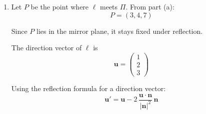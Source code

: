 \documentclass[leqno]{article}
\begin{document}
\begin{enumerate}[
  label=\textbf{\arabic*.},
  leftmargin=*,
  topsep=0pt,
  partopsep=0pt,
  parsep=0pt
]
\begin{djsSolution}
\begin{enumerate}[label=\textbf{(\alph*)}]
  So the image point is \(A'=(8,0,5)\).

  {\setlength{\parskip}{8pt}%
  \textit{Alternative Solution:}

  Find \(A'\) using the point \(B\) from part (b).

  From part (b), the perpendicular from \(A\) meets \(\Pi\) at \(B(4,2,3)\), so
  \[
  \overrightarrow{AB}=\begin{pmatrix}4\\2\\3\end{pmatrix}-\begin{pmatrix}0\\4\\1\end{pmatrix}=\begin{pmatrix}4\\-2\\2\end{pmatrix}
  \]

  Since \(B\) is the midpoint of \(AA'\), \(\overrightarrow{AA'}=2\overrightarrow{AB}\), so
  \[
  \overrightarrow{OA'}=\begin{pmatrix}0\\4\\1\end{pmatrix}+2\begin{pmatrix}4\\-2\\2\end{pmatrix}=\begin{pmatrix}8\\0\\5\end{pmatrix}
  \]

  So \(A'=(8,0,5)\), as before.
  \par}

  \item Let \(P\) be the point where \(\ell\) meets \(\Pi\). From part (a):
  \[
  P=(3,4,7)
  \]

  Since \(P\) lies in the mirror plane, it stays fixed under reflection.

  The direction vector of \(\ell\) is
  \[
  \mathbf u=\begin{pmatrix}1\\2\\3\end{pmatrix}
  \]

  Using the reflection formula for a direction vector:
  \[
  \mathbf u'
  =\mathbf u-2\,\dfrac{\mathbf u\cdot\mathbf n}{|\mathbf n|^2}\,\mathbf n
  \]


\end{enumerate}
\end{djsSolution}
\end{enumerate}
\end{document}
